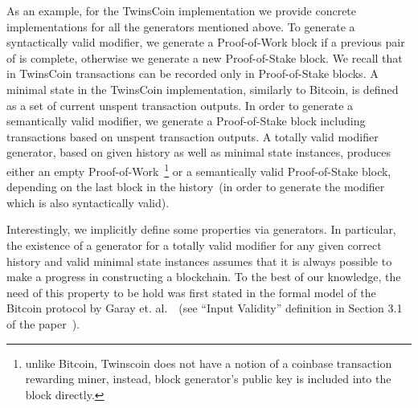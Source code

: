As an example, for the TwinsCoin implementation we provide concrete implementations for all the generators mentioned above. To generate a syntactically valid modifier, we generate a Proof-of-Work block if a previous pair of {\em<Proof-of-Work block, Proof-of-Stake block>} is complete, otherwise we generate a new Proof-of-Stake block. We recall that in TwinsCoin transactions can be recorded only in Proof-of-Stake blocks. A minimal state in the TwinsCoin implementation, similarly to Bitcoin, is defined as a set of current unspent transaction outputs. In order to generate a semantically valid modifier, we generate a Proof-of-Stake block including transactions based on unspent transaction outputs. A totally valid modifier generator, based on given history as well as minimal state instances, produces either an empty Proof-of-Work~\footnote{unlike Bitcoin, Twinscoin does not have a notion of a coinbase transaction rewarding miner, instead, block generator's public key is included into the block directly.} or a semantically valid Proof-of-Stake block, depending on the last block in the history~(in order to generate the modifier which is also syntactically valid). 

Interestingly, we implicitly define some properties via generators. In particular, the existence of a generator for a totally valid modifier for any given correct history and valid minimal state instances assumes that it is always possible to make a progress in constructing a blockchain. To the best of our knowledge, the need of this property to be hold was first stated in the formal model of the Bitcoin protocol by Garay et. al.~\cite{Garay2015}~(see ``Input Validity'' definition in Section 3.1 of the paper~\cite{Garay2015}). 


